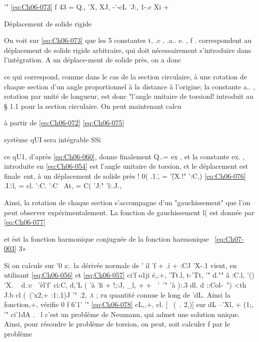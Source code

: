 '" 
\eqref{eq:Ch06-073} 
f 43 = Q., 'X, XJ, 	-'-cL 'J:, 1-.c Xi + { 
Déplacement de solide rigide 

On voit sur \eqref{eq:Ch06-073} que les 5 constantes t, .c , .a.. e. , f . correspondent au déplacement de solide rigide arbitraire, qui doit nécessairement s'introduire dans l'intégration. A un déplace-ment de solide près, on a donc 


ce qui correspond, comme dans le cas de la section circulaire, à une rotation de chaque section d'un angle proportionnel à la distance à l'origine; la cons­tante a.. , rotation par unité de longueur, est donc "l'angle unitaire de tor­sionl! introduit au § 1.1 pour la section circulaire. On peut maintenant calcu­

à partir de \eqref{eq:Ch06-072} 
\eqref{eq:Ch06-075} 

système qUI sera intégrable SSi 


ce qU1, d'après \eqref{eq:Ch06-060}, donne finalement Q..= ex , et la constante ex. , introduite en \eqref{eq:Ch06-054} est l'angle unitaire de torsion, et le déplacement est finale~ent, à un déplacement de solide près 
! 
0(
.1.\., = '\f (X.!" ':C,) 
\eqref{eq:Ch06-076} 
.I.\.:l, = cl. ':C. ':C~ 
At, = C( 'J:" 'l:.J., 

Ainsi, la rotation de chaque section s'accompagne d'un "gauchissement" que l'on peut observer expérimentalement. La fonction de gauchissement l( est donnée par 
\eqref{eq:Ch06-077} 


et \f est la fonction harmonique conjuguée de la fonction harmonique 
~\eqref{eq:Ch07-003} 3» 

Si 	on calcule sur '0 z:. la dérivée normale de \fl ' il
'f + 	.ï + :CJ
'X-.1 
vient, en utilisant \eqref{eq:Ch06-056} et \eqref{eq:Ch06-057} 
ci'f o1ji é,,+,
'Tt.l, t-'Tt,
'" 
d."" â :C.l, '() 'X. ~ d.:c~ 'èl'f' ci:C, d,'L
( 'à 'fi 	+ !;:J, _l,
+ 	+ ~'\
'" 	'à ):.3 dl. d ::Col-~") <th J.b cl (~('x2,+ :1:.1)J
'" .2, .t ;
ru 
quantité connue le long de 'dL. Ainsi la fonction,+, vérifie 
0
f 	6'1' '" 
\eqref{eq:Ch06-078} 	cL,,+, cl. [~ (~. 2,)] sur dL
--'Xl, + (1;,
'" 
ci'1\. dA .~
l 
c'est un problème de Neumann, qui admet une solution unique. Ainsi, pour résoudre le problème de torsion, on peut, soit calculer f par le problème 

}
